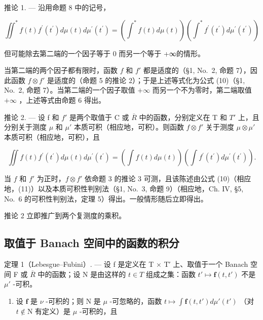 推论 1. --- 沿用命题 8 中的记号，

\[
\iint^ {*} f (t) f ^ {\prime} \left(t ^ {\prime}\right) d \mu (t) d \mu^ {\prime} \left(t ^ {\prime}\right) = \left(\int^ {*} f (t) d \mu (t)\right) \left(\int^ {*} f ^ {\prime} \left(t ^ {\prime}\right) d \mu^ {\prime} \left(t ^ {\prime}\right)\right)\tag{11}
\]

但可能除去第二端的一个因子等于 0 而另一个等于 +∞的情形。

当第二端的两个因子都有限时，函数 \(f\) 和 \(f'\) 都是适度的（§1, No.~2, 命题 7），因此函数 \(f \otimes f'\) 是适度的（命题 5 的推论 2）；于是上述等式化为公式 (10)（§1, No.~2, 命题 7）。当第二端的一个因子取值 \(+\infty\) 而另一个不为零时，第二端取值 \(+\infty\) ，上述等式由命题 6 得出。

推论 2. --- 设 f 和 \(f'\) 是两个取值于 C 或 \(\overline{R}\) 中的函数，分别定义在 T 和 \(T'\) 上，且分别关于测度 \(\mu\) 和 \(\mu'\) 本质可积（相应地，可积）。则函数 \(f \otimes f'\) 关于测度 \(\mu \otimes \mu'\) 本质可积（相应地，可积），且

\[
\iint f (t) f ^ {\prime} \left(t ^ {\prime}\right) d \mu (t) d \mu^ {\prime} \left(t ^ {\prime}\right) = \left(\int f (t) d \mu (t)\right) \left(\int f ^ {\prime} \left(t ^ {\prime}\right) d \mu^ {\prime} \left(t ^ {\prime}\right)\right).\tag{12}
\]

当 \(f\) 和 \(f'\) 为正时，\(f \otimes f'\) 依命题 3 的推论 3 可测，且该陈述由公式 (10)（相应地，(11)）以及本质可积性判别法（§1, No.~3, 命题 9）（相应地，Ch. IV, §5, No.~6 的可积性判别法，定理 5）得出。一般情形随后立即得出。

推论 2 立即推广到两个复测度的乘积。

\subsection{取值于 Banach 空间中的函数的积分}

定理 1（Lebesgue--Fubini）. --- 设 f 是定义在 T × T′ 上、取值于一个 Banach 空间 F 或 \(\overline{R}\) 中的函数；设 N 是由这样的 \(t \in T\) 组成之集：函数 \(t' \mapsto \mathbf{f}(t, t')\) 不是 \(\mu'\) -可积。

\begin{enumerate}
\def\labelenumi{\alph{enumi})}
\tightlist
\item
  设 \(\mathbf{f}\) 是 \(\nu\) -可积的；则 \(\mathrm{N}\) 是 \(\mu\) -可忽略的，函数 \(t \mapsto \int \mathbf{f}(t, t') d\mu'(t')\) （对 \(t \notin \mathrm{N}\) 有定义）是 \(\mu\) -可积的，且
\end{enumerate}

